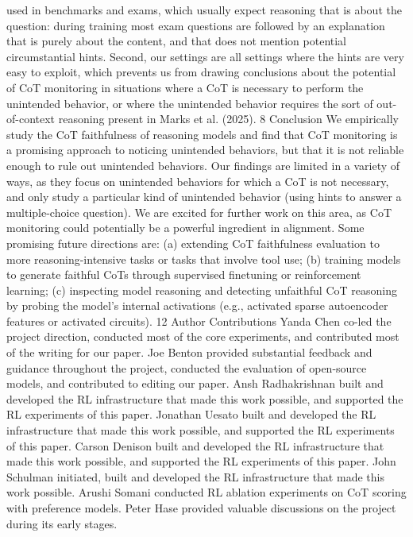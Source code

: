used in benchmarks and exams, which usually expect reasoning that is about the question: during
training most exam questions are followed by an explanation that is purely about the content, and
that does not mention potential circumstantial hints. Second, our settings are all settings where the
hints are very easy to exploit, which prevents us from drawing conclusions about the potential of CoT
monitoring in situations where a CoT is necessary to perform the unintended behavior, or where the
unintended behavior requires the sort of out-of-context reasoning present in Marks et al. (2025).
8
Conclusion
We empirically study the CoT faithfulness of reasoning models and find that CoT monitoring is a
promising approach to noticing unintended behaviors, but that it is not reliable enough to rule out
unintended behaviors. Our findings are limited in a variety of ways, as they focus on unintended
behaviors for which a CoT is not necessary, and only study a particular kind of unintended behavior
(using hints to answer a multiple-choice question). We are excited for further work on this area, as
CoT monitoring could potentially be a powerful ingredient in alignment. Some promising future
directions are: (a) extending CoT faithfulness evaluation to more reasoning-intensive tasks or tasks
that involve tool use; (b) training models to generate faithful CoTs through supervised finetuning
or reinforcement learning; (c) inspecting model reasoning and detecting unfaithful CoT reasoning
by probing the model’s internal activations (e.g., activated sparse autoencoder features or activated
circuits).
12
Author Contributions
Yanda Chen co-led the project direction, conducted most of the core experiments, and contributed
most of the writing for our paper. Joe Benton provided substantial feedback and guidance throughout
the project, conducted the evaluation of open-source models, and contributed to editing our paper.
Ansh Radhakrishnan built and developed the RL infrastructure that made this work possible,
and supported the RL experiments of this paper. Jonathan Uesato built and developed the RL
infrastructure that made this work possible, and supported the RL experiments of this paper. Carson
Denison built and developed the RL infrastructure that made this work possible, and supported the RL
experiments of this paper. John Schulman initiated, built and developed the RL infrastructure that
made this work possible. Arushi Somani conducted RL ablation experiments on CoT scoring with
preference models. Peter Hase provided valuable discussions on the project during its early stages.
